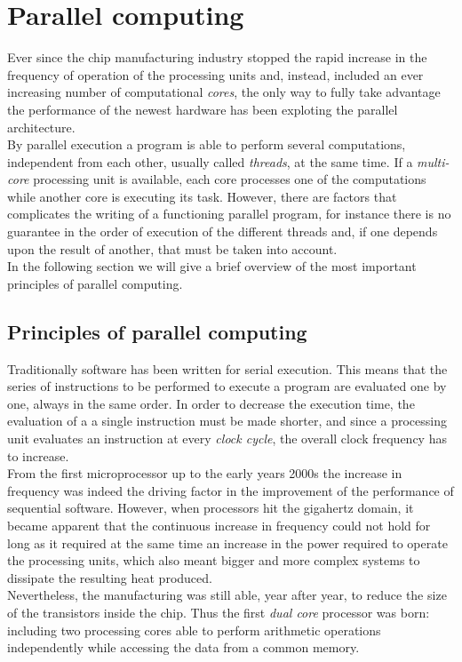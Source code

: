 \chapter{Parallel computing}\label{ch:gpu}
Ever since the chip manufacturing industry stopped the rapid increase in the frequency of operation of the processing units and, instead, included an ever increasing number of computational \textit{cores}, the only way to fully take advantage the performance of the newest hardware has been exploting the parallel architecture.\\
By parallel execution a program is able to perform several computations, independent from each other, usually called \textit{threads}, at the same time. If a \textit{multi-core} processing unit is available, each core processes one of the computations while another core is executing its task. However, there are factors that complicates the writing of a functioning parallel program, for instance there is no guarantee in the order of execution of the different threads and, if one depends upon the result of another, that must be taken into account.\\
In the following section we will give a brief overview of the most important principles of parallel computing.

\section{Principles of parallel computing}
Traditionally software has been written for serial execution. This means that the series of instructions to be performed to execute a program are evaluated one by one, always in the same order. In order to decrease the execution time, the evaluation of a a single instruction must be made shorter, and since a processing unit evaluates an instruction at every \textit{clock cycle}, the overall clock frequency has to increase.\\
From the first microprocessor up to the early years 2000s the increase in frequency was indeed the driving factor in the improvement of the performance of sequential software. However, when processors hit the gigahertz domain, it became apparent that the continuous increase in frequency could not hold for long as it required at the same time an increase in the power required to operate the processing units, which also meant bigger and more complex systems to dissipate the resulting heat produced.\\
Nevertheless, the manufacturing was still able, year after year, to reduce the size of the transistors inside the chip. Thus the first \textit{dual core} processor was born: including two processing cores able to perform arithmetic operations independently while accessing the data from a common memory.\\

